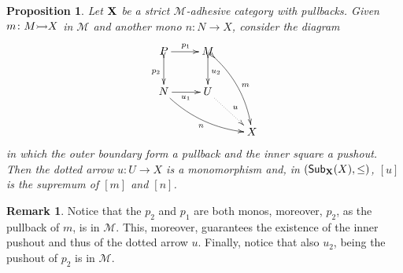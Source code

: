 \documentclass[a4paper]{article}
\newcommand{\msub}[2]{\mathsf{Sub}_{\textbf {\textup{#1}}}(#2)}
\newcommand{\mto}[0]{\scalebox{1}{$\rightarrowtail$}}
\def\X{\textbf {\textup{X}}}
\newtheorem{proposition}[theorem]{Proposition}
\theoremstyle{definition}
\newtheorem{remark}[theorem]{Remark}
\begin{document}
\begin{proposition}\label{prop:uni2} Let $\X$ be a strict $\mathcal{M}$-adhesive category with pullbacks. Given  $m\colon M\mto X$ in $\mathcal{M}$  and another mono $n\colon N\to X$, consider the diagram 
	\[\xymatrix{P \ar[r]^{p_1} \ar@{>->}[d]_{p_2} & M\ar@{>->}[d]^{u_2} \ar@{>->}@/^.3cm/[ddr]^{m} \\ N \ar@/_.3cm/[drr]_{n}\ar[r]_{u_1} & U \ar@{.>}[dr]^{u} \\ && X}\]
	in which the outer boundary form a pullback and the inner square a pushout. Then the dotted arrow $u\colon U\to X$ is a monomorphism and, in $(\msub{X}{X}, \leq)$, $[u]$ is the supremum of $[m]$ and $[n]$.  
\end{proposition}
\begin{remark}
	Notice that the  $p_2$ and $p_1$ are both monos, moreover, $p_2$, as the pullback of $m$, is in $\mathcal{M}$. This, moreover, guarantees the existence of the inner pushout and thus of the dotted arrow $u$.  Finally, notice that also $u_2$, being the pushout of $p_2$ is in $\mathcal{M}$.
\end{remark}
\end{document}
